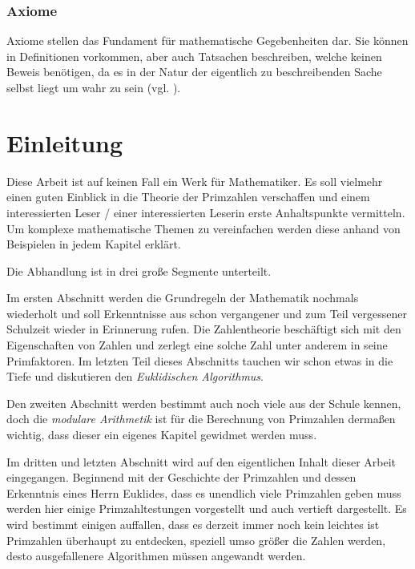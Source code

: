 \documentclass[12pt,a4paper]{article}
\theoremstyle{definition}
\begin{document}
\subsubsection*{Axiome}
Axiome stellen das Fundament für mathematische Gegebenheiten dar.
Sie können in Definitionen vorkommen, aber auch Tatsachen beschreiben, welche keinen Beweis benötigen, da es in der Natur der eigentlich zu beschreibenden Sache selbst liegt um wahr zu sein (vgl. \cite[119--122]{Houston2012}).
\newpage

\section*{Einleitung}
Diese Arbeit ist auf keinen Fall ein Werk für Mathematiker.
Es soll vielmehr einen guten Einblick in die Theorie der Primzahlen verschaffen und einem interessierten Leser / einer interessierten Leserin erste Anhaltspunkte vermitteln.
Um komplexe mathematische Themen zu vereinfachen werden diese anhand von Beispielen in jedem Kapitel erklärt.

Die Abhandlung ist in drei große Segmente unterteilt.

Im ersten Abschnitt werden die Grundregeln der Mathematik nochmals wiederholt und soll Erkenntnisse aus schon vergangener und zum Teil vergessener Schulzeit wieder in Erinnerung rufen.
Die Zahlentheorie beschäftigt sich mit den Eigenschaften von Zahlen und zerlegt eine solche Zahl unter anderem in seine Primfaktoren.
Im letzten Teil dieses Abschnitts tauchen wir schon etwas in die Tiefe und diskutieren den \textit{Euklidischen Algorithmus}.

Den zweiten Abschnitt werden bestimmt auch noch viele aus der Schule kennen, doch die \textit{modulare Arithmetik} ist für die Berechnung von Primzahlen dermaßen wichtig, dass dieser ein eigenes Kapitel gewidmet werden muss.

Im dritten und letzten Abschnitt wird auf den eigentlichen Inhalt dieser Arbeit eingegangen.
Beginnend mit der Geschichte der Primzahlen und dessen Erkenntnis eines Herrn Euklides, dass es unendlich viele Primzahlen geben muss werden hier einige Primzahltestungen vorgestellt und auch vertieft dargestellt.
Es wird bestimmt einigen auffallen, dass es derzeit immer noch kein leichtes ist Primzahlen überhaupt zu entdecken, speziell umso größer die Zahlen werden, desto ausgefallenere Algorithmen müssen angewandt werden.
\newpage

\setcounter{section}{0}
\setcounter{page}{1}
\end{document}
